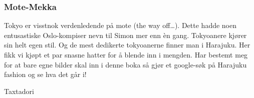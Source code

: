 \subsubsection{Mote-Mekka}
Tokyo er visstnok verdenledende på mote (the way off\ldots). Dette
hadde noen entusastiske Oslo-kompiser nevn til Simon mer enn èn gang.
Tokyoanere kjører sin helt egen stil. Og de mest dedikerte tokyoanerne
finner man i Harajuku. Her fikk vi kjøpt et par snasne hatter for å
blende inn i mengden. Har bestemt meg for at bare egne bilder skal inn i
denne boka så gjør et google-søk på Harajuku fashion og se hva det går
i!

Taxtadori 
